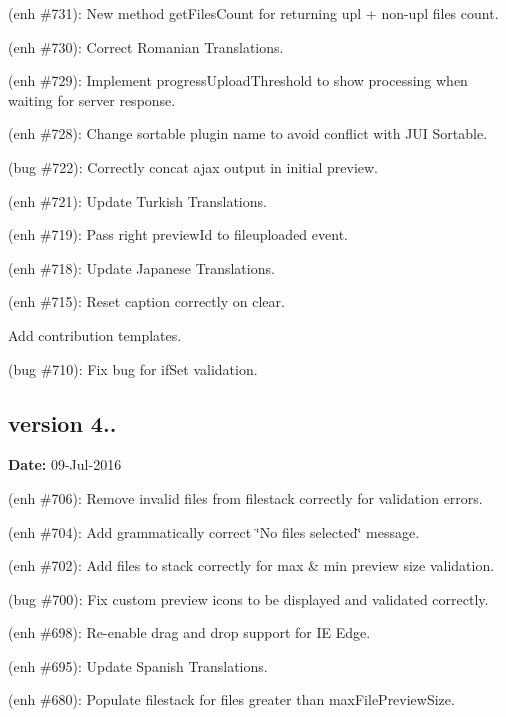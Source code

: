 \begin{DoxyItemize}
\item (enh \#731)\+: New method {\ttfamily get\+Files\+Count} for returning upl + non-\/upl files count.
\item (enh \#730)\+: Correct Romanian Translations.
\item (enh \#729)\+: Implement {\ttfamily progress\+Upload\+Threshold} to show processing when waiting for server response.
\item (enh \#728)\+: Change sortable plugin name to avoid conflict with J\+UI Sortable.
\item (bug \#722)\+: Correctly concat ajax output in initial preview.
\item (enh \#721)\+: Update Turkish Translations.
\item (enh \#719)\+: Pass right {\ttfamily preview\+Id} to {\ttfamily fileuploaded} event.
\item (enh \#718)\+: Update Japanese Translations.
\item (enh \#715)\+: Reset caption correctly on clear.
\item Add contribution templates.
\item (bug \#710)\+: Fix bug for {\ttfamily if\+Set} validation.
\end{DoxyItemize}

\subsection*{version 4..}

{\bfseries Date\+:} 09-\/\+Jul-\/2016


\begin{DoxyItemize}
\item (enh \#706)\+: Remove invalid files from filestack correctly for validation errors.
\item (enh \#704)\+: Add grammatically correct \char`\"{}\+No files selected\char`\"{} message.
\item (enh \#702)\+: Add files to stack correctly for max \& min preview size validation.
\item (bug \#700)\+: Fix custom preview icons to be displayed and validated correctly.
\item (enh \#698)\+: Re-\/enable drag and drop support for IE Edge.
\item (enh \#695)\+: Update Spanish Translations.
\item (enh \#680)\+: Populate filestack for files greater than max\+File\+Preview\+Size.
\end{DoxyItemize}

